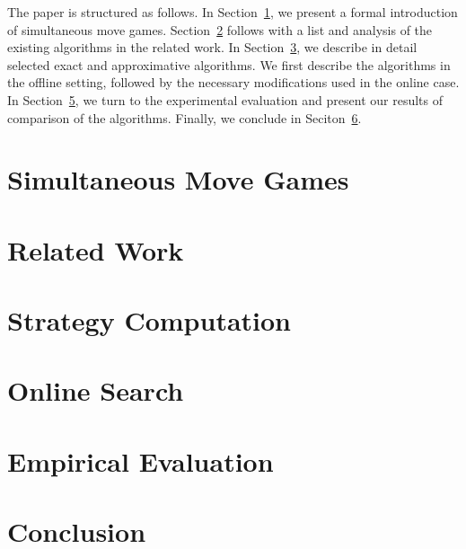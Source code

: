 \documentclass[preprint,12pt]{elsarticle}
\newcounter{bbNoteCounter}
\newcommand{\bbosansky}[1]{{\small \color{orange} $\blacktriangle$ \refstepcounter{bbNoteCounter}\textsf{[BB]$_{\arabic{bbNoteCounter}}$:{#1}}}}
\begin{document}
The paper is structured as follows. In Section~\ref{sec:smg}, we present a formal introduction of simultaneous move games. 
Section~\ref{sec:relwork} follows with a list and analysis of the existing algorithms in the related work. In 
Section~\ref{sec:offline}, we describe in detail selected exact and approximative algorithms.
We first describe the algorithms in the offline setting, followed by the necessary modifications used in the online case.
In Section~\ref{sec:eval}, we turn to the experimental evaluation and present our results of comparison of the algorithms.
Finally, we conclude in Seciton~\ref{sec:conc}.


\section{Simultaneous Move Games}  \label{sec:smg}

 

\section{Related Work} \label{sec:relwork}



\section{Strategy Computation} \label{sec:offline}

 

\section{Online Search} \label{sec:online}



\section{Empirical Evaluation} \label{sec:eval}



\section{Conclusion} \label{sec:conc}
\end{document}
